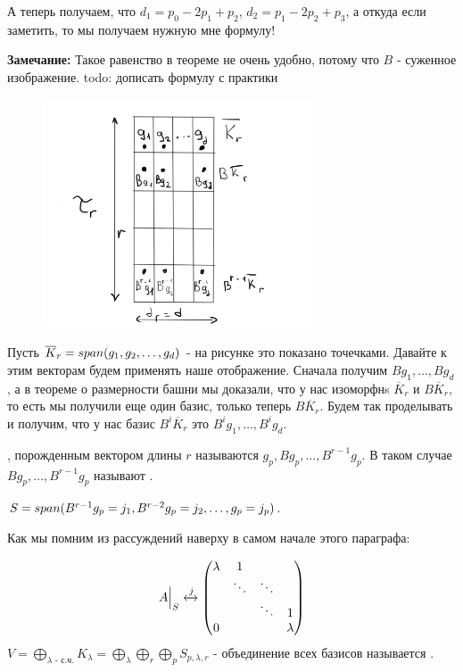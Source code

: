 А теперь получаем, что $d_1 = p_0 - 2p_1 + p_2$, $d_2 = p_1-2p_2 + p_3$, а откуда если заметить, то мы получаем нужную мне формулу!

\textbf{Замечание:} Такое равенство в теореме не очень удобно, потому что $B $ - суженное изображение.  todo: дописать формулу с практики

\begin{figure} 
\begin{center}
    \includegraphics[width = 8cm]{assets/7_9-zhordan-table.png}
\end{center}
\end{figure}

Пусть $\overline{K}_r = span(g_1,g_2,\ldots,g_d)$ - на рисунке это показано точечками. Давайте к этим векторам будем применять наше отображение. Сначала получим $Bg_1,\ldots,Bg_d$, а в теореме о размерности башни мы доказали, что у нас изоморфнs $\overline{K}_r$ и $B\overline{K}_r$, то есть мы получили еще один базис, только теперь $B\overline{K}_r$. Будем так проделывать и получим, что у нас базис $B^i\overline{K}_r$ это $B^ig_1,\ldots, B^ig_d$.

 , порожденным вектором длины $r$ называются $g_p,Bg_p,\ldots,B^{r-1}g_p$. В таком случае $Bg_p,\ldots,B^{r-1}g_p$ называют .

$S = span (B^{r-1}g_p = j_1, B^{r-2}g_p =j_2 ,\ldots,g_p=j_p)$.

Как мы помним из рассуждений наверху в самом начале этого параграфа:

$$A\Big|_S  \xleftrightarrow{j}\begin{pmatrix}
    \lambda & 1 & &\\
     & \ddots &\ddots &\\
     & & \ddots & 1 \\
     0& &  &\lambda 
\end{pmatrix}$$
$V = \bigoplus\limits_{\lambda\text{ - с.ч.}} K_\lambda = \bigoplus\limits_{\lambda}\bigoplus\limits_{r}\bigoplus\limits_{p}S_{p,\lambda,r}$ - объединение всех базисов называется .

